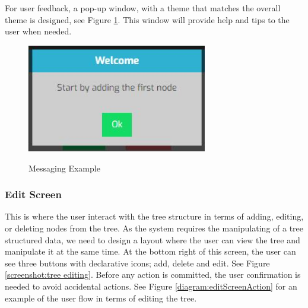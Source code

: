 \documentclass[11pt]{article} %
\begin{document}
\noindent For user feedback, a pop-up window, with a theme that matches the overall theme is designed, see Figure \ref{screenshot:message}. This window will provide help and tips to the user when needed.

\begin{figure}[h!]
  \caption{Messaging Example}
  \centering
  \includegraphics[width=0.7\textwidth]{message}
  \label{screenshot:message}
\end{figure}

\subsubsection{Edit Screen}
This is where the user interact with the tree structure in terms of adding, editing, or deleting nodes from the tree.
As the system requires the manipulating of a tree structured data, we need to design a layout where the user can view the tree and manipulate it at the same time. At the bottom right of this screen, the user can see three buttons with declarative icons; add, delete and edit. See Figure \ref{screenshot:tree editing}. Before any action is committed, the user confirmation is needed to avoid accidental actions. See Figure \ref{diagram:editScreenAction} for an example of the user flow in terms of editing the tree.
\end{document}
